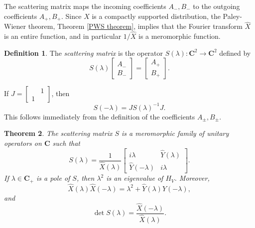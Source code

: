 \documentclass[12pt]{report}
\newcommand{\CC}{\mathbf{C}}
\newcommand{\dfn}[1]{\emph{#1}\index{#1}}
\newtheorem{theorem}{Theorem}[chapter]
\theoremstyle{definition}
\newtheorem{definition}[theorem]{Definition}
\begin{document}
The scattering matrix maps the incoming coefficients $A_-,B_-$ to the outgoing coefficients $A_+,B_+$. Since $X$ is a compactly supported distribution, the Paley-Wiener theorem, Theorem \ref{PWS theorem},
implies that the Fourier transform $\hat X$ is an entire function, and in particular $1/\hat X$ is a meromorphic function.
\begin{definition}
\label{scattering matrix definition}
The \dfn{scattering matrix} is the operator $S(\lambda): \CC^2 \to \CC^2$ defined by
$$S(\lambda)\begin{bmatrix}A_-\\B_-\end{bmatrix} = \begin{bmatrix}A_+\\B_+\end{bmatrix}.$$
\end{definition}
If $J = \begin{bmatrix}&1\\1\end{bmatrix}$, then
$$S(-\lambda) = JS(\lambda)^{-1}J.$$
This follows immediately from the definition of the coefficients $A_\pm,B_\pm$.
\begin{theorem}
\label{properties of scatmat}
  The scattering matrix $S$ is a meromorphic family of unitary operators on $\CC$ such that
\begin{equation}
\label{formula for S}
S(\lambda) = \frac{1}{\hat X(\lambda)}\begin{bmatrix}i\lambda & \hat Y(\lambda)\\ \hat Y(-\lambda) & i\lambda\end{bmatrix}.
\end{equation}
  If $\lambda \in \CC_+$ is a pole of $S$, then $\lambda^2$ is an eigenvalue of $H_V$.
  Moreover,
  \begin{equation}
  \label{unitarity for Xhat}
  \hat X(\lambda)\hat X(-\lambda) = \lambda^2 + \hat Y(\lambda)\hat Y(-\lambda),
  \end{equation}
  and
  \begin{equation}
  \label{determinant of scatmat}
  \det S(\lambda) = \frac{\hat X(-\lambda)}{\hat X(\lambda)}.
  \end{equation}
\end{theorem}
\end{document}
